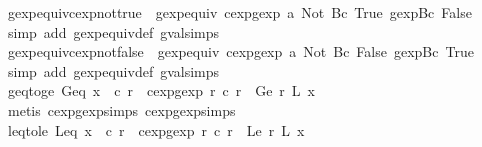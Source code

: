 \begin{isabellebody}
\isanewline
{}\isamarkupfalse%
\ gexp{\isacharunderscore}equiv{\isacharunderscore}cexp{\isacharunderscore}not{\isacharunderscore}true{\isacharcolon}\ \ {\isachardoublequoteopen}gexp{\isacharunderscore}equiv\ {\isacharparenleft}cexp{}gexp\ a\ {\isacharparenleft}Not\ {\isacharparenleft}Bc\ True{\isacharparenright}{\isacharparenright}{\isacharparenright}\ {\isacharparenleft}gexp{\isachardot}Bc\ False{\isacharparenright}{\isachardoublequoteclose}\isanewline
%
\isadelimproof
\ \ %
\endisadelimproof
%
\isatagproof
{}\isamarkupfalse%
\ {\isacharparenleft}simp\ add{\isacharcolon}\ gexp{\isacharunderscore}equiv{\isacharunderscore}def\ gval{\isachardot}simps{\isacharparenright}%
\endisatagproof
{\isafoldproof}%
%
\isadelimproof
\isanewline
%
\endisadelimproof
\isanewline
{}\isamarkupfalse%
\ gexp{\isacharunderscore}equiv{\isacharunderscore}cexp{\isacharunderscore}not{\isacharunderscore}false{\isacharcolon}\ \ {\isachardoublequoteopen}gexp{\isacharunderscore}equiv\ {\isacharparenleft}cexp{}gexp\ a\ {\isacharparenleft}Not\ {\isacharparenleft}Bc\ False{\isacharparenright}{\isacharparenright}{\isacharparenright}\ {\isacharparenleft}gexp{\isachardot}Bc\ True{\isacharparenright}{\isachardoublequoteclose}\isanewline
%
\isadelimproof
\ \ %
\endisadelimproof
%
\isatagproof
{}\isamarkupfalse%
\ {\isacharparenleft}simp\ add{\isacharcolon}\ gexp{\isacharunderscore}equiv{\isacharunderscore}def\ gval{\isachardot}simps{\isacharparenright}%
\endisatagproof
{\isafoldproof}%
%
\isadelimproof
\isanewline
%
\endisadelimproof
\isanewline
{}\isamarkupfalse%
\ geq{\isacharunderscore}to{\isacharunderscore}ge{\isacharcolon}\ {\isachardoublequoteopen}Geq\ x\ {\isacharequal}\ c\ r\ {\isasymLongrightarrow}\ {\isacharparenleft}cexp{}gexp\ r\ {\isacharparenleft}c\ r{\isacharparenright}{\isacharparenright}\ {\isacharequal}\ Ge\ r\ {\isacharparenleft}L\ x{\isacharparenright}{\isachardoublequoteclose}\isanewline
%
\isadelimproof
\ \ %
\endisadelimproof
%
\isatagproof
{}\isamarkupfalse%
\ {\isacharparenleft}metis\ cexp{}gexp{\isachardot}simps{\isacharparenleft}{}{\isacharparenright}\ cexp{}gexp{\isachardot}simps{\isacharparenleft}{}{\isacharparenright}{\isacharparenright}%
\endisatagproof
{\isafoldproof}%
%
\isadelimproof
\isanewline
%
\endisadelimproof
\isanewline
{}\isamarkupfalse%
\ leq{\isacharunderscore}to{\isacharunderscore}le{\isacharcolon}\ {\isachardoublequoteopen}Leq\ x\ {\isacharequal}\ c\ r\ {\isasymLongrightarrow}\ {\isacharparenleft}cexp{}gexp\ r\ {\isacharparenleft}c\ r{\isacharparenright}{\isacharparenright}\ {\isacharequal}\ Le\ r\ {\isacharparenleft}L\ x{\isacharparenright}{\isachardoublequoteclose}\isanewline

\end{isabellebody}
